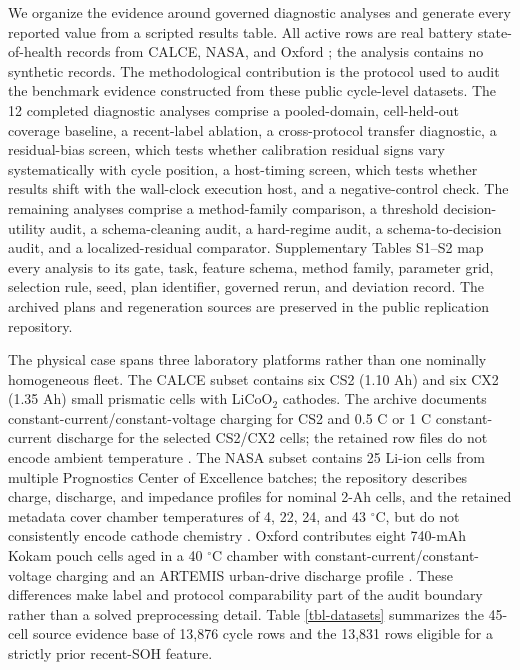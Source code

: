 \documentclass[
  number,
  preprint]{elsarticle}
\begin{document}
We organize the evidence around governed diagnostic analyses and
generate every reported value from a scripted results table. All active
rows are real battery state-of-health records from CALCE, NASA, and
Oxford
\citep{calce_battery_data, nasa_pcoe_battery_data, howey2017oxford}; the
analysis contains no synthetic records. The methodological contribution
is the protocol used to audit the benchmark evidence constructed from
these public cycle-level datasets. The 12 completed diagnostic analyses
comprise a pooled-domain, cell-held-out coverage baseline, a
recent-label ablation, a cross-protocol transfer diagnostic, a
residual-bias screen, which tests whether calibration residual signs
vary systematically with cycle position, a host-timing screen, which
tests whether results shift with the wall-clock execution host, and a
negative-control check. The remaining analyses comprise a method-family
comparison, a threshold decision-utility audit, a schema-cleaning audit,
a hard-regime audit, a schema-to-decision audit, and a
localized-residual comparator. Supplementary Tables S1--S2 map every
analysis to its gate, task, feature schema, method family, parameter
grid, selection rule, seed, plan identifier, governed rerun, and
deviation record. The archived plans and regeneration sources are
preserved in the public replication repository.

The physical case spans three laboratory platforms rather than one
nominally homogeneous fleet. The CALCE subset contains six CS2 (1.10 Ah)
and six CX2 (1.35 Ah) small prismatic cells with LiCoO\(_2\) cathodes.
The archive documents constant-current/constant-voltage charging for CS2
and 0.5 C or 1 C constant-current discharge for the selected CS2/CX2
cells; the retained row files do not encode ambient temperature
\citep{calce_battery_data}. The NASA subset contains 25 Li-ion cells
from multiple Prognostics Center of Excellence batches; the repository
describes charge, discharge, and impedance profiles for nominal 2-Ah
cells, and the retained metadata cover chamber temperatures of 4, 22,
24, and 43 \(^\circ\)C, but do not consistently encode cathode chemistry
\citep{nasa_pcoe_battery_data}. Oxford contributes eight 740-mAh Kokam
pouch cells aged in a 40 \(^\circ\)C chamber with
constant-current/constant-voltage charging and an ARTEMIS urban-drive
discharge profile \citep{howey2017oxford}. These differences make label
and protocol comparability part of the audit boundary rather than a
solved preprocessing detail. Table \ref{tbl-datasets} summarizes the
45-cell source evidence base of 13,876 cycle rows and the 13,831 rows
eligible for a strictly prior recent-SOH feature.
\end{document}
